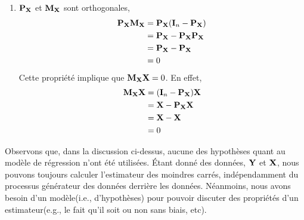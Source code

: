 \begin{enumerate}
\item $\mathbf P_\mathbf X$ et $\mathbf M_\mathbf X$ sont orthogonales,
\begin{align*}
\mathbf P_\mathbf X\mathbf M_\mathbf X &= \mathbf P_\mathbf X(\mathbf{I}_n -  \mathbf P_\mathbf X)\\
& =  \mathbf P_\mathbf X -  \mathbf P_\mathbf X \mathbf P_\mathbf X\\
&= \mathbf P_\mathbf X- \mathbf P_\mathbf X\\
&=0
\end{align*}
Cette propriété implique que $\mathbf M_\mathbf X\mathbf X = 0$. En effet,
\begin{align*}
\mathbf M_\mathbf X\mathbf X &= (\mathbf{I}_n - \mathbf P_\mathbf X)\mathbf X\\ 
&= \mathbf X-\mathbf P_\mathbf X\mathbf X\\
& = \mathbf X - \mathbf X\\
& = 0
\end{align*}
\end{enumerate}
Observons que, dans la discussion ci-dessus, aucune des hypothèses quant au modèle de régression n'ont été utilisées. \'Etant donné des données, $\mathbf Y$ et $\mathbf X$, nous pouvons toujours calculer l'estimateur des moindres carrés, indépendamment du processus générateur des données derrière les données. Néanmoins, nous avons besoin d'un modèle(i.e., d'hypothèses) pour pouvoir discuter des propriétés d'un estimateur(e.g., le fait qu'il soit ou non sans biais, etc).


